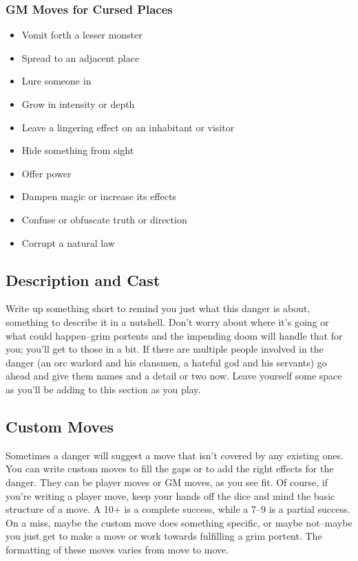 \subsubsection{GM Moves for Cursed Places}
\begin{itemize}
\item Vomit forth a lesser monster
\item Spread to an adjacent place
\item Lure someone in
\item Grow in intensity or depth
\item Leave a lingering effect on an inhabitant or visitor
\item Hide something from sight
\item Offer power
\item Dampen magic or increase its effects
\item Confuse or obfuscate truth or direction
\item Corrupt a natural law

\end{itemize}

\subsection{Description and Cast}


Write up something short to remind you just what this danger is about, something to describe it in a nutshell. Don't worry about where it's going or what could happen--grim portents and the impending doom will handle that for you; you'll get to those in a bit. If there are multiple people involved in the danger (an orc warlord and his clansmen, a hateful god and his servants) go ahead and give them names and a detail or two now. Leave yourself some space as you'll be adding to this section as you play.
\subsection{Custom Moves}


Sometimes a danger will suggest a move that isn't covered by any existing ones. You can write custom moves to fill the gaps or to add the right effects for the danger. They can be player moves or GM moves, as you see fit. Of course, if you're writing a player move, keep your hands off the dice and mind the basic structure of a move. A 10+ is a complete success, while a 7--9 is a partial success. On a miss, maybe the custom move does something specific, or maybe not--maybe you just get to make a move or work towards fulfilling a grim portent. The formatting of these moves varies from move to move.


